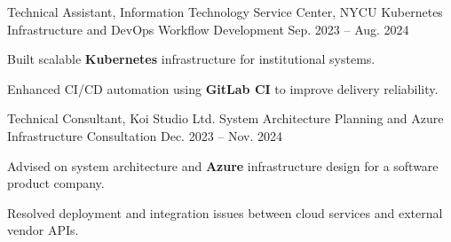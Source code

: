 \begin{cventries}
  \cventry
    {Technical Assistant, Information Technology Service Center, NYCU} %
    {Kubernetes Infrastructure and DevOps Workflow Development} %
    {} %
    {Sep. 2023 -- Aug. 2024} %
    {
      \begin{cvitems}
        \item {Built scalable \textbf{Kubernetes} infrastructure for institutional systems.}
        \item {Enhanced CI/CD automation using \textbf{GitLab CI} to improve delivery reliability.}
      \end{cvitems}
    }

  \cventry
    {Technical Consultant, Koi Studio Ltd.} %
    {System Architecture Planning and Azure Infrastructure Consultation} %
    {} %
    {Dec. 2023 -- Nov. 2024} %
    {
      \begin{cvitems}
        \item {Advised on system architecture and \textbf{Azure} infrastructure design for a software product company.}
        \item {Resolved deployment and integration issues between cloud services and external vendor APIs.}
      \end{cvitems}
    }

\end{cventries}
